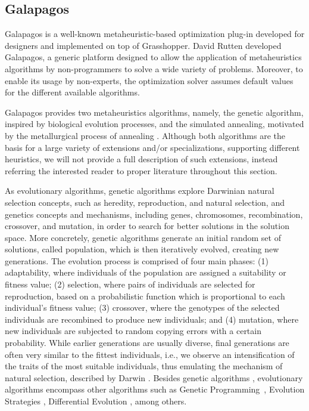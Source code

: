 \subsection{Galapagos}
\label{subsec:galapagos}
Galapagos is a well-known metaheuristic-based optimization plug-in developed for designers and implemented on top of Grasshopper. David Rutten developed Galapagos, a generic platform designed to allow the application of metaheuristics algorithms by non-programmers to solve a wide variety of problems. Moreover, to enable its usage by non-experts, the optimization solver assumes default values for the different available algorithms. 

Galapagos provides two metaheuristics algorithms, namely, the genetic algorithm, inspired by biological evolution processes, and the simulated annealing, motivated by the metallurgical process of annealing \cite{Brownlee2011}. Although both algorithms are the basis for a large variety of extensions and/or specializations, supporting different heuristics, we will not provide a full description of such extensions, instead referring the interested reader to proper literature throughout this section. 

As evolutionary algorithms, genetic algorithms explore Darwinian natural selection concepts, such as heredity, reproduction, and natural selection, and genetics concepts and mechanisms, including genes, chromosomes, recombination, crossover, and mutation, in order to search for better solutions in the solution space. More concretely, genetic algorithms generate an initial random set of solutions, called population, which is then iteratively evolved, creating new generations. The evolution process is comprised of four main phases: (1) adaptability, where individuals of the population are assigned a suitability or fitness value; (2) selection, where pairs of individuals are selected for reproduction, based on a probabilistic function which is proportional to each individual's fitness value; (3) crossover, where the genotypes of the selected individuals are recombined to produce new individuals; and (4) mutation, where new individuals are subjected to random copying errors with a certain probability. While earlier generations are usually diverse, final generations are often very similar to the fittest individuals, i.e., we observe an intensification of the traits of the most suitable individuals, thus emulating the mechanism of natural selection, described by Darwin \cite{Brownlee2011}. Besides genetic algorithms \cite{Golberg1989,Holland1992}, evolutionary algorithms encompass other algorithms such as Genetic Programming~\cite{Koza1992}, Evolution Strategies \cite{Schwefel1981}, Differential Evolution \cite{Storn1997}, among others. 
	
